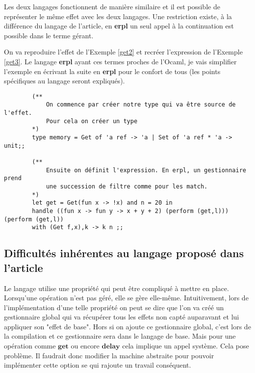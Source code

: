 Les deux langages fonctionnent de manière similaire et il est possible de représenter le même effet
avec les deux langages. Une restriction existe, à la différence du langage de l'article, en \textbf{erpl}
un seul appel à la continuation est possible dans le terme gérant.

\begin{exemple}
    On va reproduire l'effet de l'Exemple \ref{get2} et recréer l'expression de l'Exemple \ref{get3}. 
    Le langage \textbf{erpl} ayant ces termes proches de l'Ocaml, je vais simplifier l'exemple en 
    écrivant la suite en \textbf{erpl} pour le confort de tous (les points spécifiques au langage seront expliqués).
    

    \begin{verbatim}
        (** 
            On commence par créer notre type qui va être source de l'effet. 
            Pour cela on créer un type 
        *)
        type memory = Get of 'a ref -> 'a | Set of 'a ref * 'a -> unit;;

        (**
            Ensuite on définit l'expression. En erpl, un gestionnaire prend
            une succession de filtre comme pour les match.
        *)
        let get = Get(fun x -> !x) and n = 20 in
        handle ((fun x -> fun y -> x + y + 2) (perform (get,l))) (perform (get,l)) 
        with (Get f,x),k -> k n ;;
    \end{verbatim}

\end{exemple}

\subsection{Difficultés inhérentes au langage proposé dans l'article}

Le langage utilise une propriété qui peut être compliqué à mettre en place. Lorsqu'une opération
n'est pas géré, elle se gère elle-même. Intuitivement, lors de l'implémentation d'une telle propriété
on peut se dire que l'on va créé un gestionnaire global qui va récupérer tous les effets non capté auparavant
et lui appliquer son "effet de base". Hors si on ajoute ce gestionnaire global, c'est lors de la compilation et 
ce gestionnaire sera dans le langage de base. Mais pour une opération comme $\textbf{get}$ ou encore $\textbf{delay}$ 
cela implique un appel système. Cela pose problème. Il faudrait donc modifier la machine abstraite pour pouvoir
implémenter cette option se qui rajoute un travail conséquent.